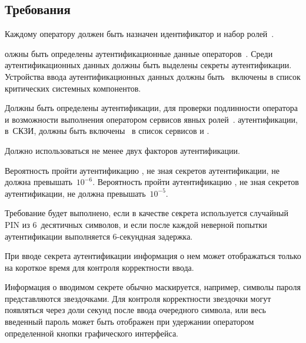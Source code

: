 \subsection{Требования}\label{IA.Reqs}

\label{R.IA.Id} %
Каждому оператору должен быть назначен идентификатор и набор 
ролей~.

\label{R.IA.AuthData} %
олжны быть определены аутентификационные данные 
операторов~. 
% 
Среди аутентификационных данных должны быть выделены 
секреты аутентификации.
%
Устройства ввода аутентификационных данных должны быть~ 
включены в список критических системных компонентов. 

\label{R.IA.Auth} %
Должны быть определены  аутентификации, 
 для проверки подлинности оператора и возможности 
выполнения оператором сервисов явных ролей~.
%
 аутентификации,  в~СКЗИ,
должны быть включены~ в список сервисов
и .

\label{R.IA.2FA} %
Должно использоваться не менее двух факторов аутентификации.

\label{R.IA.AuthStrength} %
Вероятность пройти аутентификацию , 
не зная секретов аутентификации, 
не должна превышать~$10^{-6}$.
%
Вероятность пройти аутентификацию , 
не зная секретов аутентификации, 
не должна превышать~$10^{-5}$.

\begin{note}
Требование будет выполнено, если в качестве секрета используется случайный PIN
из $6$~десятичных символов, и если после каждой неверной попытки аутентификации
выполняется $6$-секундная задержка.
\end{note}

\label{R.IA.PwdMask} %
При вводе секрета аутентификации информация о нем может отображаться только на 
короткое время для контроля корректности ввода.

\begin{note}
Информация о вводимом секрете обычно маскируется, например, символы пароля
представляются звездочками. Для контроля корректности звездочки могут появляться
через доли секунд после ввода очередного символа, или весь 
введенный пароль может быть отображен при удержании оператором определенной 
кнопки графического интерфейса.
\end{note}

